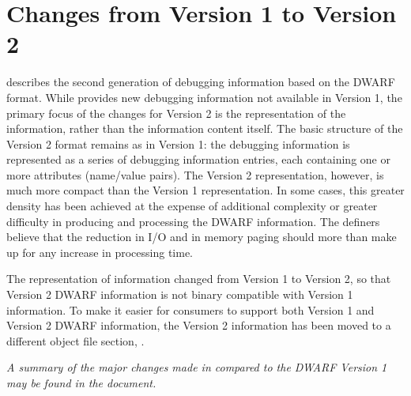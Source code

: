 \section{Changes from Version 1 to Version 2}
describes the second generation of debugging
information based on the DWARF format. While 
provides new debugging information not available in
Version 1, the primary focus of the changes for Version
2 is the representation of the information, rather than
the information content itself. The basic structure of
the Version 2 format remains as in Version 1: the debugging
information is represented as a series of debugging information
entries, each containing one or more attributes (name/value
pairs). The Version 2 representation, however, is much more
compact than the Version 1 representation. In some cases,
this greater density has been achieved at the expense of
additional complexity or greater difficulty in producing and
processing the DWARF information. The definers believe that the
reduction in I/O and in memory paging should more than make
up for any increase in processing time.  

The representation
of information changed from Version 1 to Version 2, so that
Version 2 DWARF information is not binary compatible with
Version 1 information. To make it easier for consumers to
support both Version 1 and Version 2 DWARF information, the
Version 2 information has been moved to a different object
file section, \dotdebuginfo{}.  

\textit{
A summary of the major changes made in 
compared to the DWARF Version 1 may be found in the 
document.
}

